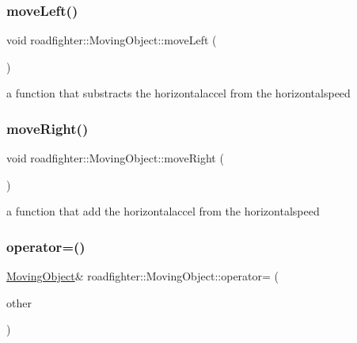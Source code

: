 \subsubsection{\texorpdfstring{move\+Left()}{moveLeft()}}
{\footnotesize\ttfamily void roadfighter\+::\+Moving\+Object\+::move\+Left (\begin{DoxyParamCaption}{ }\end{DoxyParamCaption})\hspace{0.3cm}{\ttfamily [virtual]}}

a function that substracts the horizontalaccel from the horizontalspeed \mbox{\label{classroadfighter_1_1MovingObject_a11dee0cb3d69fbc252a56ad3efef4226}} 
\subsubsection{\texorpdfstring{move\+Right()}{moveRight()}}
{\footnotesize\ttfamily void roadfighter\+::\+Moving\+Object\+::move\+Right (\begin{DoxyParamCaption}{ }\end{DoxyParamCaption})\hspace{0.3cm}{\ttfamily [virtual]}}

a function that add the horizontalaccel from the horizontalspeed \mbox{\label{classroadfighter_1_1MovingObject_a46d710b11219a0e973eb1e4d3b375851}} 
\subsubsection{\texorpdfstring{operator=()}{operator=()}\hspace{0.1cm}{\footnotesize\ttfamily [1/2]}}
{\footnotesize\ttfamily \hyperlink{classroadfighter_1_1MovingObject}{Moving\+Object}\& roadfighter\+::\+Moving\+Object\+::operator= (\begin{DoxyParamCaption}\item[{const \hyperlink{classroadfighter_1_1MovingObject}{Moving\+Object} \&}]{other }\end{DoxyParamCaption})\hspace{0.3cm}{\ttfamily [default]}}

